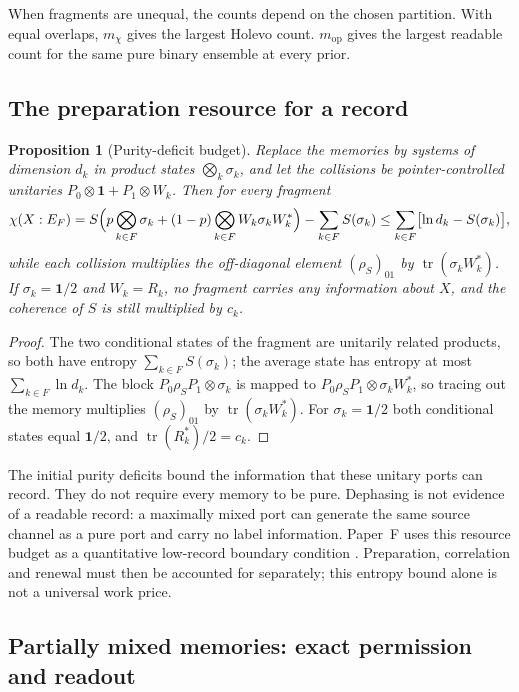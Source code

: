 \documentclass[12pt,a4paper]{article}
\newtheorem{proposition}[theorem]{Proposition}
\begin{document}
When fragments are unequal, the counts depend on the chosen partition. With equal overlaps, $m_\chi$ gives the largest Holevo count. $m_{\mathrm{op}}$ gives the largest readable count for the same pure binary ensemble at every prior.

\subsection{The preparation resource for a record}

\begin{proposition}[Purity-deficit budget]
\label{prop:purity}
Replace the memories by systems of dimension $d_k$ in product states $\bigotimes_k\sigma_k$, and let the collisions be pointer-controlled unitaries $P_0\otimes\mathbf 1+P_1\otimes W_k$. Then for every fragment
\[
\chi(X:E_F)=S\Bigl(p\bigotimes_{k\in F}\sigma_k+(1-p)\bigotimes_{k\in F}W_k\sigma_kW_k^*\Bigr)-\sum_{k\in F}S(\sigma_k)
\le\sum_{k\in F}\bigl[\ln d_k-S(\sigma_k)\bigr],
\]
while each collision multiplies the off-diagonal element $(\rho_S)_{01}$ by $\operatorname{tr}(\sigma_kW_k^*)$. If $\sigma_k=\mathbf 1/2$ and $W_k=R_k$, no fragment carries any information about $X$, and the coherence of $S$ is still multiplied by $c_k$.
\end{proposition}

\begin{proof}
The two conditional states of the fragment are unitarily related products, so both have entropy $\sum_{k\in F}S(\sigma_k)$; the average state has entropy at most $\sum_{k\in F}\ln d_k$. The block $P_0\rho_SP_1\otimes\sigma_k$ is mapped to $P_0\rho_SP_1\otimes\sigma_kW_k^*$, so tracing out the memory multiplies $(\rho_S)_{01}$ by $\operatorname{tr}(\sigma_kW_k^*)$. For $\sigma_k=\mathbf 1/2$ both conditional states equal $\mathbf 1/2$, and $\operatorname{tr}(R_k^*)/2=c_k$.
\end{proof}

The initial purity deficits bound the information that these unitary
ports can record. They do not require every memory to be pure.
Dephasing is not evidence of a readable record: a maximally mixed
port can generate the same source channel as a pure port and carry
no label information. Paper~F uses this resource budget as a
quantitative low-record boundary condition \cite{Liu2026PaperF}.
Preparation, correlation and renewal must then be accounted for
separately; this entropy bound alone is not a universal work price.

\subsection{Partially mixed memories: exact permission and readout}
\label{sec:mixed}
\end{document}
